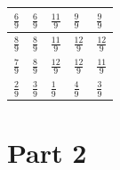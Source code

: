 \documentclass[12pt]{article}
\begin{document}
\begin{center}
\begin{tabular}{|l|l|l|l|l|}
\hline
\hspace{1mm} $\frac{6}{9}$ & \hspace{1mm} $\frac{6}{9}$& \hspace{1mm}$\frac{11}{9}$ & \hspace{1mm} $\frac{9}{9}$& \hspace{1mm}$\frac{9}{9} $\\ \hline
\hspace{1mm} $\frac{8}{9}$ & \hspace{1mm} $\frac{8}{9}$& \hspace{1mm}$\frac{11}{9}$ & \hspace{1mm} $\frac{12}{9}$& \hspace{1mm}$ \frac{12}{9}$\\ \hline
\hspace{1mm} $\frac{7}{9}$& \hspace{1mm} $\frac{8}{9}$& \hspace{1mm}$\frac{12}{9}$ & \hspace{1mm} $\frac{12}{9} $& \hspace{1mm}$ \frac{11}{9}$\\ \hline
\hspace{1mm} $\frac{2}{9}$ & \hspace{1mm} $\frac{3}{9}$ & \hspace{1mm}$\frac{1}{9}$ & \hspace{1mm} $\frac{4}{9}$& \hspace{1mm}$ \frac{3}{9}$\\ \hline
\end{tabular}
\end{center}

\section*{Part 2}
\end{document}
